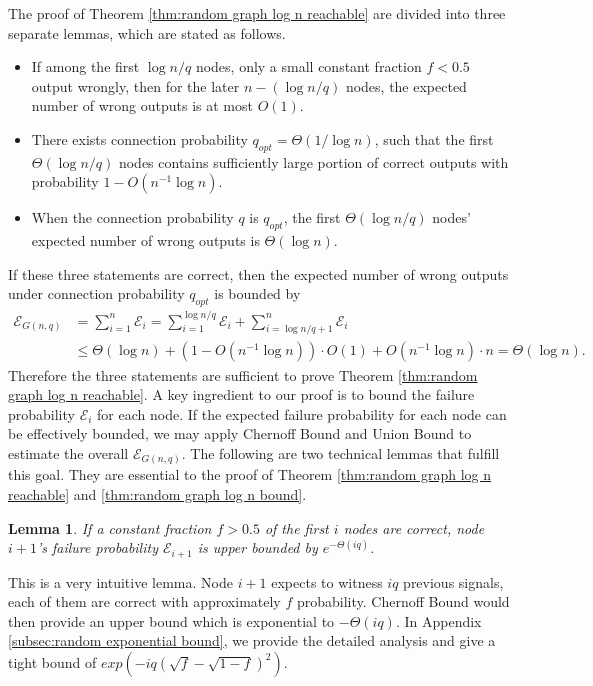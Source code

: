 \documentclass[a4paper,UKenglish]{lipics}
\newtheorem{lem}[thm]{Lemma}
\theoremstyle{definition}
\begin{document}
The proof of Theorem \ref{thm:random graph log n reachable} are divided into three separate lemmas, which are stated as follows.
\begin{itemize}
\item If among the first $\log n/q$ nodes, 
		only a small constant fraction $f < 0.5$ output wrongly, 
		then for the later $n - (\log n/q)$ nodes, the expected number of wrong outputs is at most $O(1)$.
\item There exists connection probability $q_{opt} = \Theta(1/\log n)$, such that the first $\Theta(\log n/q)$ nodes 
		contains sufficiently large portion of correct outputs with probability $1 - O(n^{-1}\log n)$.
\item When the connection probability $q$ is $q_{opt}$, the first $\Theta(\log n/q)$ nodes' expected number of wrong outputs is $\Theta(\log n)$.
\end{itemize}
If these three statements are correct, then the expected number of wrong outputs under connection probability $q_{opt}$ is bounded by
\begin{equation}
\begin{aligned}
\label{equ:bound2}
	\mathcal{E}_{G(n,q)}
& =
	\sum_{i=1}^{n}	\mathcal{E}_i
	=
	\sum_{i=1}^{\log n/q}	\mathcal{E}_i + \sum_{i=\log n/q + 1}^{n}	\mathcal{E}_i
\\
& \le
	\Theta(\log n) + (1 - O(n^{-1}\log n))\cdot O(1) + O(n^{-1}\log n)\cdot n
	=
	\Theta(\log n).
\end{aligned}
\end{equation}
Therefore the three statements are sufficient to prove Theorem \ref{thm:random graph log n reachable}.
A key ingredient to our proof is to bound the failure probability $\mathcal{E}_i$ for each node.
If the expected failure probability for each node can be effectively bounded, 
	we may apply Chernoff Bound and Union Bound to estimate the overall $\mathcal{E}_{G(n,q)}$.
The following are two technical lemmas that fulfill this goal.
They are essential to the proof of Theorem \ref{thm:random graph log n reachable} and \ref{thm:random graph log n bound}.

\begin{lem} 
\label {lem:random exponential bound}
If a constant fraction $f > 0.5$ of the first $i$ nodes are correct, 
	node $i+1$'s failure probability $\mathcal{E}_{i+1}$ is upper bounded by $e^{-\Theta(iq)}$. 
\end{lem}

This is a very intuitive lemma.
Node $i+1$ expects to witness $iq$ previous signals, each of them are correct with approximately $f$ probability.
Chernoff Bound would then provide an upper bound which is exponential to $-\Theta(iq)$.
In Appendix \ref{subsec:random exponential bound}, we provide the detailed analysis
	and give a tight bound of $exp({-iq(\sqrt{f} - \sqrt{1-f})^2})$.
\end{document}
